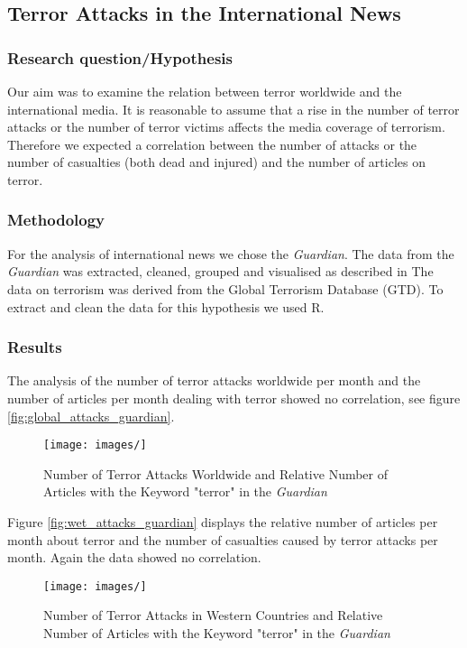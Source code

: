 \subsection{Terror Attacks in the International News}

\subsubsection{Research question/Hypothesis}
Our aim was to examine the relation between terror worldwide and the international media. It is reasonable to assume that a rise in the number of terror attacks or the number of terror victims affects the media coverage of terrorism. Therefore we expected a correlation between the number of attacks or the number of casualties (both dead and injured) and the number of articles on terror.
 
\subsubsection{Methodology}
For the analysis of international news we chose the \textit{Guardian}. The data from the \textit{Guardian} was extracted, cleaned, grouped and visualised as described in %
The data on terrorism was derived from the Global Terrorism Database (GTD). To extract and clean the data for this hypothesis we used R.
 
\subsubsection{Results}
The analysis of the number of terror attacks worldwide per month and the number of articles per month dealing with terror showed no correlation, see figure \autoref{fig:global_attacks_guardian}.
 
 \begin{figure}
  \centering
    \texttt{[image: images/]}
    \caption{Number of Terror Attacks Worldwide and Relative Number of Articles with the Keyword "terror" in the \textit{Guardian}}
    \label{fig:glob_attacks_guardian}
\end{figure}

Figure \autoref{fig:wet_attacks_guardian} displays the relative number of articles per month about terror and the number of casualties caused by terror attacks per month. Again the data showed no correlation.

\begin{figure}
  \centering
    \texttt{[image: images/]}
    \caption{Number of Terror Attacks in Western Countries and Relative Number of Articles with the Keyword "terror" in the \textit{Guardian}}
    \label{fig:west_attacks_guardian}
\end{figure}

